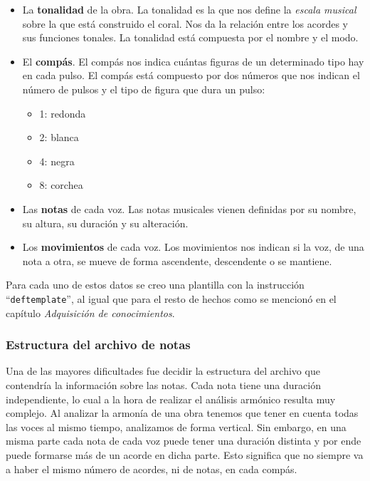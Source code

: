 \begin{itemize}

	\item La \textbf{tonalidad} de la obra. La tonalidad es la que nos define la \textit{escala musical} sobre la que está construido el coral. Nos da la relación entre los acordes y sus funciones tonales. La tonalidad está compuesta por el nombre y el modo.

	\item El \textbf{compás}. El compás nos indica cuántas figuras de un determinado tipo hay en cada pulso. El compás está compuesto por dos números que nos indican el número de pulsos y el tipo de figura que dura un pulso:

	\begin{itemize}
		\item 1: redonda
		\item 2: blanca
		\item 4: negra
		\item 8: corchea
	\end{itemize}

	\item Las \textbf{notas} de cada voz. Las notas musicales vienen definidas por su nombre, su altura, su duración y su alteración.

	\item Los \textbf{movimientos} de cada voz. Los movimientos nos indican si la voz, de una nota a otra, se mueve de forma ascendente, descendente o se mantiene.

\end{itemize}

Para cada uno de estos datos se creo una plantilla con la instrucción ``\texttt{deftemplate}'', al igual que para el resto de hechos como se mencionó en el capítulo \textit{Adquisición de conocimientos}. 

\subsubsection{Estructura del archivo de notas}

Una de las mayores dificultades fue decidir la estructura del archivo que contendría la información sobre las notas. Cada nota tiene una duración independiente, lo cual a la hora de realizar el análisis armónico resulta muy complejo. Al analizar la armonía de una obra tenemos que tener en cuenta todas las voces al mismo tiempo, analizamos de forma vertical. Sin embargo, en una misma parte cada nota de cada voz puede tener una duración distinta y por ende puede formarse más de un acorde en dicha parte. Esto significa que no siempre va a haber el mismo número de acordes, ni de notas, en cada compás.

